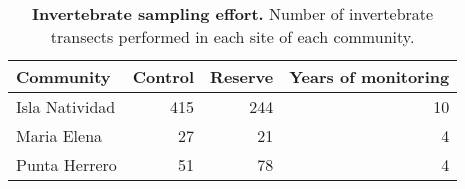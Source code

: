 \begin{table}[t]

\caption{\label{tab:}{\bf Invertebrate sampling effort.} Number of invertebrate transects performed in each site of each community.}
\centering
\begin{tabular}{lrrr}
\toprule
Community & Control & Reserve & Years of monitoring\\
\midrule
Isla Natividad & 415 & 244 & 10\\
Maria Elena & 27 & 21 & 4\\
Punta Herrero & 51 & 78 & 4\\
\bottomrule
\end{tabular}
\end{table}